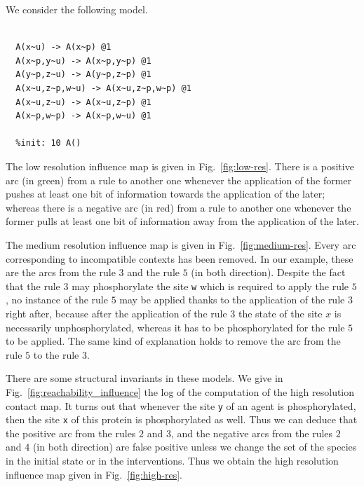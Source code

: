 \documentclass[11pt]{book}
\begin{document}
We consider the following model.
\begin{lstlisting}[language=kappa]
  %agent: A(w~u~p,x~u~p,y~u~p,z~u~p)

  A(x~u) -> A(x~p) @1
  A(x~p,y~u) -> A(x~p,y~p) @1
  A(y~p,z~u) -> A(y~p,z~p) @1
  A(x~u,z~p,w~u) -> A(x~u,z~p,w~p) @1
  A(x~u,z~u) -> A(x~u,z~p) @1
  A(x~p,w~p) -> A(x~p,w~u) @1

  %init: 10 A()
\end{lstlisting}

The low resolution influence map is given in Fig.~\ref{fig:low-res}.
There is a positive arc (in green) from a rule to another one whenever the application of the former pushes at least one bit of information towards the application of the later; whereas there is a negative arc (in red) from a rule to another one whenever the former pulls at least one bit of information away from the application of the later.

The medium resolution influence map is given in Fig.~\ref{fig:medium-res}.
Every arc corresponding to incompatible contexts has been removed.
In our example, these are the arcs from the rule $3$ and the rule $5$ (in both direction). Despite the fact that the rule $3$ may phosphorylate the site \texttt{w} which is required to apply the rule $5$, no instance of the rule $5$ may be applied thanks to the application of the rule $3$ right after, because after the application of the rule $3$ the state of the site $x$ is necessarily unphosphorylated, whereas it has to be phosphorylated for the rule $5$ to be applied. The same kind of explanation holds to remove the arc from the rule $5$ to the rule $3$.

There are some structural invariants in these models. We give in Fig.~\ref{fig:reachability_influence} the log of the computation of the high resolution contact map. It turns out that whenever the site \texttt{y} of an agent is phosphorylated, then the site \texttt{x} of this protein is phosphorylated as well. Thus we can deduce that the positive arc from the rules $2$ and $3$, and the negative arcs from the rules $2$ and $4$ (in both direction) are false positive unless we change the set of the species in the initial state or in the interventions. Thus we obtain the high resolution influence map given in Fig.~\ref{fig:high-res}.
\end{document}
